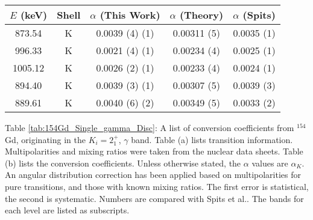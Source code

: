 \begin{table}
    \ContinuedFloat
    \begin{subtable}{\textwidth}
    \end{subtable}
    \begin{ThreePartTable}
    \begin{subtable}{\textwidth}
        \caption{}
        \begin{tabular}{c|c|c|c|c}
            \toprule
            $E$ (keV) & Shell &	$\alpha$ (This Work)	&	$\alpha$  (Theory)\citep{kibedi08:_BRICC}	&	$\alpha$ (Spits)\citep{spits96:_154gd}  \\
            \hline
            873.54	& K &	0.0039	(4)	(1) &	0.00311 (5)	&	0.0035 (1)	\\
            \hline
            996.33	& K &	0.0021	(4) (1)	&	0.00234 (4)	&	0.0025 (1)	\\
            \hline
            1005.12	& K &	0.0026	(2) (1)	&	0.00233 (4)	&	0.0024 (1)	\\
            \hline
            894.40	& K &	0.0039	(3) (1)	&	0.00307 (5)	&	0.0039 (3)	\\
            \hline
            889.61	& K &	0.0040	(6) (2)	&	0.00349 (5)	&	0.0033 (2)	\\
            \bottomrule
        \end{tabular}
        \end{subtable}

        \makeatletter\def\TPT@hsize{}\makeatletter
        
        \begin{tablenotes}[para]
            Table \ref{tab:154Gd_Single_gamma_Disc}: A list of conversion coefficients from $^{154}$Gd, originating in the $K_i=2^+_1$, $\gamma$ band. Table (a) lists transition information. Multipolarities and mixing ratios were taken from the nuclear data sheets\citep{reich09:_nds_154}. Table (b) lists the conversion coefficients. Unless otherwise stated, the $\alpha$ values are $\alpha_K$. An angular distribution correction has been applied based on multipolarities for pure transitions, and those with known mixing ratios. The first error is statistical, the second is systematic. Numbers are compared with Spits et al.\citep{spits96:_154gd}. The bands for each level are listed as subscripts.
        \end{tablenotes}
\end{ThreePartTable}
\end{table}
